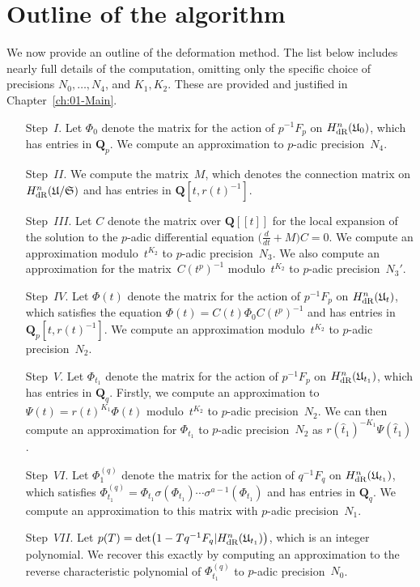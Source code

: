 
\section{Outline of the algorithm}

We now provide an outline of the deformation method.  The list below 
includes nearly full details of the computation, omitting only the 
specific choice of precisions $N_0, \dotsc, N_4$, and $K_1, K_2$.  
These are provided and justified in Chapter~\ref{ch:01-Main}.

\begin{enumerate}
\item[Step~$I$.]
Let $\Phi_0$ denote the matrix for the action of $p^{-1} F_p$ on 
$H_{\text{dR}}^{n}(\mathfrak{U}_0)$, which has entries in $\mathbf{Q}_p$.  
We compute an approximation to $p$-adic precision~$N_4$.
\item[Step~$II$.]
We compute the matrix~$M$, which denotes the connection matrix 
on $H_{\text{dR}}^{n}(\mathfrak{U}/\mathfrak{S})$ and has entries in 
$\mathbf{Q}[t,r(t)^{-1}]$.
\item[Step~$III$.]
Let $C$ denote the matrix over $\mathbf{Q}[[t]]$ for the local 
expansion of the solution to the $p$-adic differential equation 
$\bigl(\tfrac{d}{dt} + M\bigr) C = 0$.  We compute an approximation 
modulo~$t^{K_2}$ to $p$-adic precision~$N_3$.  We also compute an 
approximation for the matrix~$C(t^p)^{-1}$ modulo~$t^{K_2}$ to $p$-adic 
precision~$N_3'$.
\item[Step~$IV$.]
Let $\Phi(t)$ denote the matrix for the action of $p^{-1} F_p$ on 
$H_{\text{dR}}^{n}(\mathfrak{U}_t)$, which satisfies the equation 
$\Phi(t) = C(t) \Phi_0 C(t^p)^{-1}$ and has entries in 
$\mathbf{Q}_p[t,r(t)^{-1}]$.  We compute an approximation modulo~$t^{K_2}$ 
to $p$-adic precision~$N_2$.
\item[Step~$V$.]
Let $\Phi_{t_1}$ denote the matrix for the action of $p^{-1} F_p$ 
on $H_{\text{dR}}^{n}(\mathfrak{U}_{t_1})$, which has entries in $\mathbf{Q}_q$. 
Firstly, we compute an approximation to $\Psi(t) = r(t)^{K_1} \Phi(t)$ 
modulo~$t^{K_2}$ to $p$-adic precision~$N_2$.  We can then compute an 
approximation for $\Phi_{t_1}$ to $p$-adic precision~$N_2$ as 
$r(\hat{t}_1)^{-K_1} \Psi(\hat{t}_1)$.
\item[Step~$VI$.]
Let $\Phi_1^{(q)}$ denote the matrix for the action of $q^{-1} F_q$ on 
$H_{\text{dR}}^{n}(\mathfrak{U}_{t_1})$, which satisfies 
$\Phi_{t_1}^{(q)} = \Phi_{t_1} \sigma(\Phi_{t_1}) \dotsm \sigma^{a-1}(\Phi_{t_1})$ 
and has entries in $\mathbf{Q}_q$.  We compute an approximation to this 
matrix with $p$-adic precision~$N_1$.
\item[Step~$VII$.]
Let $p(T) = \det\bigl(1 - T q^{-1} F_q | H_{\text{dR}}^n(\mathfrak{U}_{t_1})\bigr)$, 
which is an integer polynomial.  We recover this exactly 
by computing an approximation to the reverse characteristic polynomial 
of $\Phi_{t_1}^{(q)}$ to $p$-adic precision~$N_0$.
\end{enumerate}

